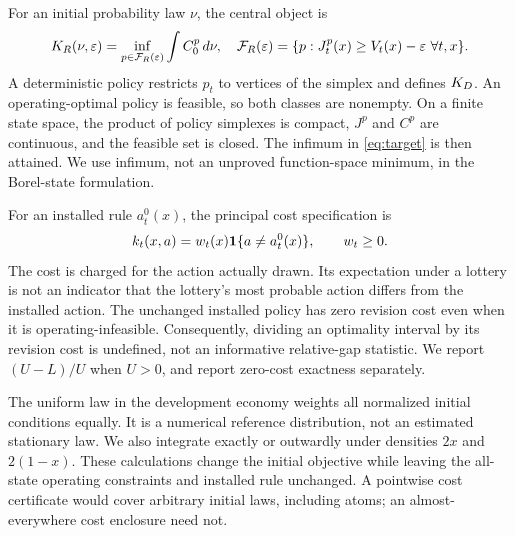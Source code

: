 For an initial probability law $\nu$, the central object is
\begin{equation}\label{eq:target}
 K_R(\nu,\varepsilon)=\inf_{p\in\mathcal F_R(\varepsilon)}\int C_0^p\,d\nu,
 \quad
 \mathcal F_R(\varepsilon)=\{p:J_t^p(x)\geq V_t(x)-\varepsilon\ \forall t,x\}.
\end{equation}
A deterministic policy restricts $p_t$ to vertices of the simplex and defines $K_D$. An operating-optimal policy is feasible, so both classes are nonempty. On a finite state space, the product of policy simplexes is compact, $J^p$ and $C^p$ are continuous, and the feasible set is closed. The infimum in \eqref{eq:target} is then attained. We use infimum, not an unproved function-space minimum, in the Borel-state formulation.

For an installed rule $a_t^0(x)$, the principal cost specification is
\begin{equation}\label{eq:revisioncost}
 k_t(x,a)=w_t(x)\mathbf 1\{a\ne a_t^0(x)\},\qquad w_t\geq0.
\end{equation}
The cost is charged for the action actually drawn. Its expectation under a lottery is not an indicator that the lottery's most probable action differs from the installed action. The unchanged installed policy has zero revision cost even when it is operating-infeasible. Consequently, dividing an optimality interval by its revision cost is undefined, not an informative relative-gap statistic. We report $(U-L)/U$ when $U>0$, and report zero-cost exactness separately.

The uniform law in the development economy weights all normalized initial conditions equally. It is a numerical reference distribution, not an estimated stationary law. We also integrate exactly or outwardly under densities $2x$ and $2(1-x)$. These calculations change the initial objective while leaving the all-state operating constraints and installed rule unchanged. A pointwise cost certificate would cover arbitrary initial laws, including atoms; an almost-everywhere cost enclosure need not.

